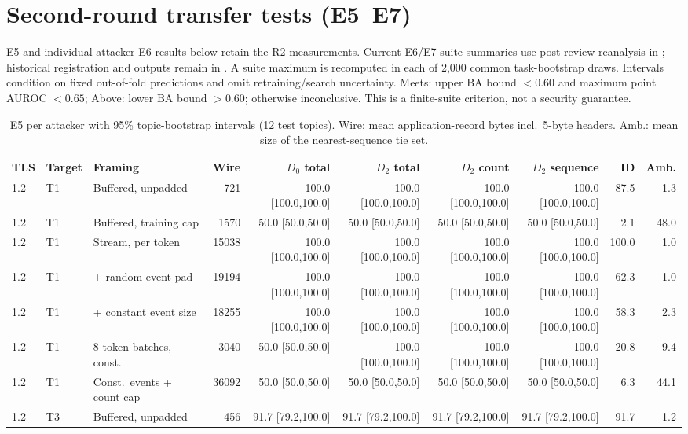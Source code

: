 \section{Second-round transfer tests (E5--E7)}\label{app:transfer}
E5 and individual-attacker E6 results below retain the R2 measurements. Current E6/E7 suite summaries use post-review reanalysis in ; historical registration and outputs remain in . A suite maximum is recomputed in each of 2,000 common task-bootstrap draws. Intervals condition on fixed out-of-fold predictions and omit retraining/search uncertainty. Meets: upper BA bound $<0.60$ and maximum point AUROC $<0.65$; Above: lower BA bound $>0.60$; otherwise inconclusive. This is a finite-suite criterion, not a security guarantee.
\begin{table}[!ht]\centering\scriptsize
\caption{E5 per attacker with 95\% topic-bootstrap intervals (12 test topics). Wire: mean application-record bytes incl.\ 5-byte headers. Amb.: mean size of the nearest-sequence tie set.}
\begin{tabular}{@{}lllrrrrrrr@{}}\toprule
TLS & Target & Framing & Wire & $D_0$ total & $D_2$ total & $D_2$ count & $D_2$ sequence & ID & Amb.\\\midrule
1.2 & T1 & Buffered, unpadded & 721 & 100.0 [100.0,100.0] & 100.0 [100.0,100.0] & 100.0 [100.0,100.0] & 100.0 [100.0,100.0] & 87.5 & 1.3\\
1.2 & T1 & Buffered, training cap & 1570 & 50.0 [50.0,50.0] & 50.0 [50.0,50.0] & 50.0 [50.0,50.0] & 50.0 [50.0,50.0] & 2.1 & 48.0\\
1.2 & T1 & Stream, per token & 15038 & 100.0 [100.0,100.0] & 100.0 [100.0,100.0] & 100.0 [100.0,100.0] & 100.0 [100.0,100.0] & 100.0 & 1.0\\
1.2 & T1 & + random event pad & 19194 & 100.0 [100.0,100.0] & 100.0 [100.0,100.0] & 100.0 [100.0,100.0] & 100.0 [100.0,100.0] & 62.3 & 1.0\\
1.2 & T1 & + constant event size & 18255 & 100.0 [100.0,100.0] & 100.0 [100.0,100.0] & 100.0 [100.0,100.0] & 100.0 [100.0,100.0] & 58.3 & 2.3\\
1.2 & T1 & 8-token batches, const. & 3040 & 50.0 [50.0,50.0] & 100.0 [100.0,100.0] & 100.0 [100.0,100.0] & 100.0 [100.0,100.0] & 20.8 & 9.4\\
1.2 & T1 & Const.\ events + count cap & 36092 & 50.0 [50.0,50.0] & 50.0 [50.0,50.0] & 50.0 [50.0,50.0] & 50.0 [50.0,50.0] & 6.3 & 44.1\\
1.2 & T3 & Buffered, unpadded & 456 & 91.7 [79.2,100.0] & 91.7 [79.2,100.0] & 91.7 [79.2,100.0] & 91.7 [79.2,100.0] & 91.7 & 1.2\\

\end{tabular}
\end{table}

